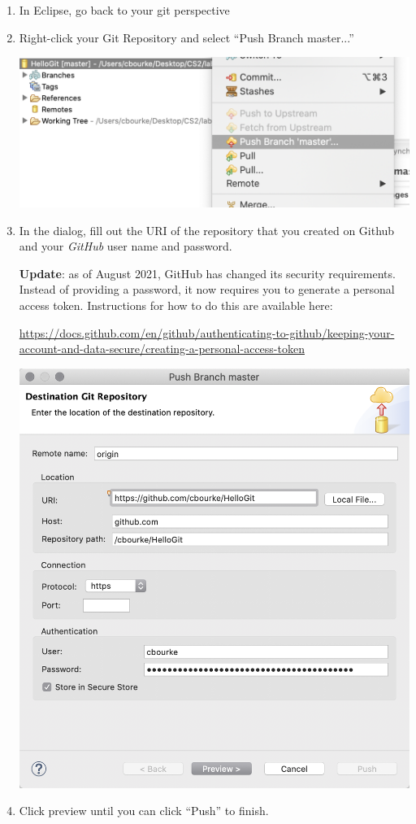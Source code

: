 \documentclass[12pt]{scrartcl}
\begin{document}
\begin{enumerate}
  \item In Eclipse, go back to your git perspective
  \item Right-click your Git Repository and select ``Push Branch master...''
   \begin{center}
	 \includegraphics[scale=0.45]{./hack1.0-files/eclipsePush}
   \end{center}
  \item In the dialog, fill out the URI of the repository that you created
  on Github and your \emph{GitHub} user name and password.
  
    \textbf{Update}: as of August 2021, GitHub has changed its security
  requirements.  Instead of providing a password, it now requires you
  to generate a personal access token.  Instructions for how to do this
  are available here:
  
  \url{https://docs.github.com/en/github/authenticating-to-github/keeping-your-account-and-data-secure/creating-a-personal-access-token}
    
   \begin{center}
	 \includegraphics[scale=0.45]{./hack1.0-files/eclipsePushDialog}
   \end{center}
  \item Click preview until you can click ``Push'' to finish.
\end{enumerate}
  
\end{document}
